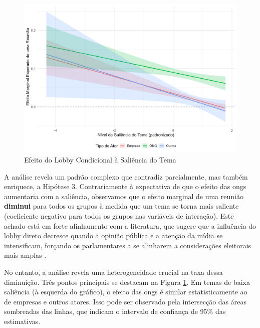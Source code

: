 \begin{figure}[htbp]
    \centering
    \includegraphics[width=\textwidth]{figures/h3_test/fig_h3_marginal_effects_manual.png}
    \caption{Efeito do Lobby Condicional à Saliência do Tema}
    \label{fig:h3_marginal_effects}
\end{figure}

A análise revela um padrão complexo que contradiz parcialmente, mas também enriquece, a Hipótese 3. Contrariamente à expectativa de que o efeito das \acrshort{ong}s aumentaria com a saliência, observamos que o efeito marginal de uma reunião \textbf{diminui} para todos os grupos à medida que um tema se torna mais saliente (coeficiente negativo para todos os grupos nas variáveis de interação). Este achado está em forte alinhamento com a literatura, que sugere que a influência do lobby direto decresce quando a opinião pública e a atenção da mídia se intensificam, forçando os parlamentares a se alinharem a considerações eleitorais mais amplas \cite{mahoney_lobbying_2007, kollman1998outside}.

No entanto, a análise revela uma heterogeneidade crucial na taxa dessa diminuição. Três pontos principais se destacam na Figura \ref{fig:h3_marginal_effects}. Em temas de baixa saliência (à esquerda do gráfico), o efeito das \acrshort{ong}s é similar estatisticamente ao de empresas e outros atores. Isso pode ser observado pela intersecção das áreas sombreadas das linhas, que indicam o intervalo de confiança de 95\% das estimativas.
    
